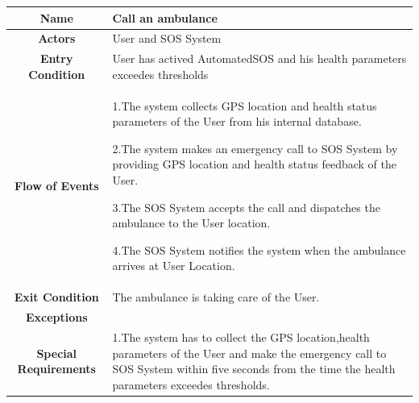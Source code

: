       \begin{table}[h!]
        \centering
        \begin{tabularx}{\linewidth}{|c|X|}
          \hline

          \textbf{Name} & Call an ambulance\\
        	\hline

        	\textbf{Actors} & User and SOS System\\
        	\hline

        	\textbf{Entry Condition} & User has actived AutomatedSOS and his health parameters exceedes thresholds\\
        	\hline

        	\textbf{Flow of Events} & 1.The system collects GPS location and health status parameters of the User from his internal 						database.

        					2.The system makes an emergency call to SOS System by providing GPS location and health 							status feedback of the User.

        					3.The SOS System accepts the call and dispatches the ambulance to the User location.

        					4.The SOS System notifies the system when the ambulance arrives at User Location.\\
        	\hline

        	\textbf{Exit Condition} & The ambulance is taking care of the User. \\
        	\hline

        	\textbf{Exceptions} & \\
        	\hline

        	\textbf{Special Requirements} & 1.The system has to collect the GPS location,health parameters of the User and make the 							emergency call to SOS System within five seconds from the time the health parameters 							exceedes thresholds.\\
          \hline
        \end{tabularx}
      \end{table}

   

